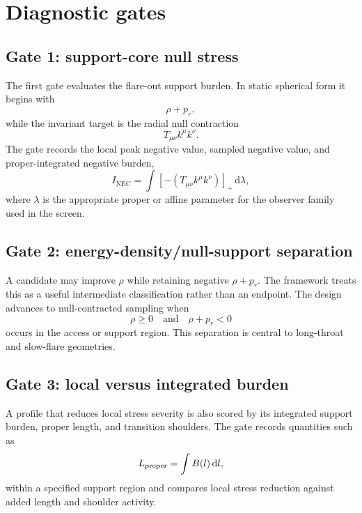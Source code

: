 \documentclass[11pt]{article}
\newcommand{\dd}{\mathrm{d}}
\newcommand{\Tkk}{T_{\mu\nu}k^\mu k^\nu}
\newcommand{\NEC}{\mathrm{NEC}}
\begin{document}
\section{Diagnostic gates}
\label{sec:gates}

\subsection{Gate 1: support-core null stress}

The first gate evaluates the flare-out support burden.  In static spherical form it begins with
\begin{equation}
 \rho+p_r,
\end{equation}
while the invariant target is the radial null contraction
\begin{equation}
 \Tkk.
\end{equation}
The gate records the local peak negative value, sampled negative value, and proper-integrated negative burden,
\begin{equation}
 I_{\NEC}=\int [-(\Tkk)]_+\,\dd\lambda,
 \label{eq:integrated_nec}
\end{equation}
where $\lambda$ is the appropriate proper or affine parameter for the observer family used in the screen.

\subsection{Gate 2: energy-density/null-support separation}

A candidate may improve $\rho$ while retaining negative $\rho+p_r$.  The framework treats this as a useful intermediate classification rather than an endpoint.  The design advances to null-contracted sampling when
\begin{equation}
 \rho \geq 0\quad\text{and}\quad \rho+p_r<0
\end{equation}
occurs in the access or support region.  This separation is central to long-throat and slow-flare geometries.

\subsection{Gate 3: local versus integrated burden}

A profile that reduces local stress severity is also scored by its integrated support burden, proper length, and transition shoulders.  The gate records quantities such as
\begin{equation}
 L_{\rm proper}=\int B(l)\,\dd l,
\end{equation}
within a specified support region and compares local stress reduction against added length and shoulder activity.
\end{document}
